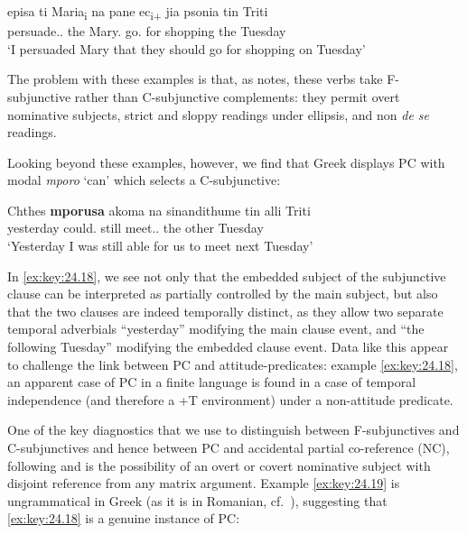 \documentclass[output=paper]{langsci/langscibook}
\begin{document}
\ea%
    \label{ex:key:24.17}  \parencite[(34a), ((35a)]{Spyropoulos2007b}
    \sn
	\gll episa       ti Maria\textsubscript{i}   na   pane ec\textsubscript{i+}   jia psonia tin Triti\\
        persuade.\Fsg{}.\Pst{}   the Mary.\Acc{} \Sbjv{} go.\Tpl{} {}  for shopping the Tuesday\\
	\glt ‘I persuaded Mary that they should go for shopping on Tuesday’\\
\z

The problem with these examples is that, as \citet{Varlokosta1994} notes, these
verbs take F-subjunctive rather than C-subjunctive complements: they permit
overt nominative subjects, strict and sloppy readings under
ellipsis, and non \emph{de se} readings.

Looking beyond these examples, however, we find that Greek displays
\gls{PC} with modal \emph{mporo} ‘can’ which
selects a C-subjunctive:

\ea%
    \label{ex:key:24.18} 
    \sn
	\gll Chthes   \textbf{mporusa}  akoma na     sinandithume tin alli Triti\\
        yesterday  could.\Fsg{}  still     \Sbjv{} meet.\Sbjv{}.\Fpl{}  the other Tuesday\\
	\glt ‘Yesterday I was still able for us to meet next Tuesday’
\z

In \eqref{ex:key:24.18}, we see not only that the embedded subject of the subjunctive clause
can be interpreted as partially controlled by the main subject, but also that
the two clauses are indeed temporally distinct, as they allow two separate
temporal adverbials “yesterday” modifying the main clause event, and “the
following Tuesday” modifying the embedded clause event. Data like this appear
to challenge the link between \gls{PC} and
attitude-predicates: example \eqref{ex:key:24.18}, an apparent case of
\gls{PC} in a finite  language is found in a
case of temporal independence (and therefore a +T environment) under a
non-attitude predicate.

One of the key diagnostics that we use to distinguish between F-subjunctives
and C-subjunctives and hence between \gls{PC} and
accidental partial co-reference (NC), following \citet{Varlokosta1994} and
\citet{Landau2004} is the possibility of an overt or covert
nominative subject with disjoint reference from any matrix
argument. Example \eqref{ex:key:24.19} is ungrammatical in Greek (as it is in
Romanian, cf.\ ), suggesting that \eqref{ex:key:24.18} is a
genuine instance of PC:
\end{document}
